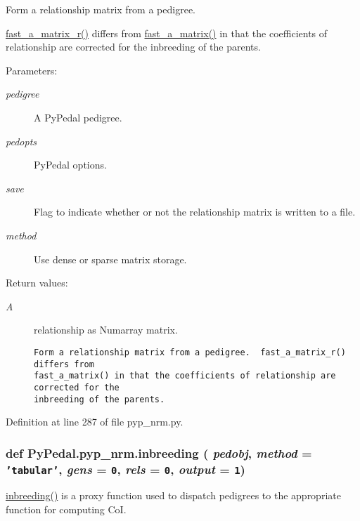 Form a relationship matrix from a pedigree. 

\hyperlink{namespacePyPedal_1_1pyp__nrm_314c945257fa3c101f6c47c1d4fb4079}{fast\_\-a\_\-matrix\_\-r()} differs from \hyperlink{namespacePyPedal_1_1pyp__nrm_d86974b6cb70f5165d7f9b41b68b613e}{fast\_\-a\_\-matrix()} in that the coefficients of relationship are corrected for the inbreeding of the parents. \begin{Desc}
\item[Parameters:]
\begin{description}
\item[{\em pedigree}]A Py\-Pedal pedigree. \item[{\em pedopts}]Py\-Pedal options. \item[{\em save}]Flag to indicate whether or not the relationship matrix is written to a file. \item[{\em method}]Use dense or sparse matrix storage. \end{description}
\end{Desc}
\begin{Desc}
\item[Return values:]
\begin{description}
\item[{\em A}]relationship as Numarray matrix.

\footnotesize\begin{verbatim}Form a relationship matrix from a pedigree.  fast_a_matrix_r() differs from
fast_a_matrix() in that the coefficients of relationship are corrected for the
inbreeding of the parents.
\end{verbatim}
\normalsize
 \end{description}
\end{Desc}


Definition at line 287 of file pyp\_\-nrm.py.\hypertarget{namespacePyPedal_1_1pyp__nrm_925b0d16b9dcbd72291dbc2c4209e428}{
\subsubsection[inbreeding]{\setlength{\rightskip}{0pt plus 5cm}def Py\-Pedal.pyp\_\-nrm.inbreeding ( {\em pedobj},  {\em method} = {\tt 'tabular'},  {\em gens} = {\tt 0},  {\em rels} = {\tt 0},  {\em output} = {\tt 1})}}
\label{namespacePyPedal_1_1pyp__nrm_925b0d16b9dcbd72291dbc2c4209e428}


\hyperlink{namespacePyPedal_1_1pyp__nrm_925b0d16b9dcbd72291dbc2c4209e428}{inbreeding()} is a proxy function used to dispatch pedigrees to the appropriate function for computing Co\-I. 


